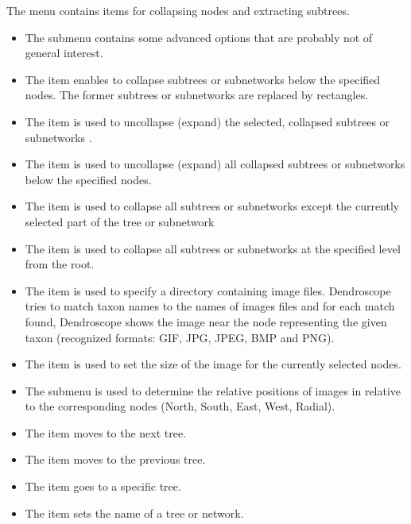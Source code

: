 \documentclass[11pt]{article}
\newcommand{\cs}[1]{\textcolor{red}{#1}}
\begin{document}
The  menu contains items for collapsing nodes and extracting subtrees.
\begin{itemize}
\item The  submenu contains some advanced options that are probably not
of general interest.
\item The  item enables to collapse subtrees or subnetworks below the  specified nodes. The former subtrees or subnetworks  are replaced by rectangles.
\item The  item is used to uncollapse (expand) the selected, collapsed subtrees or  subnetworks .
\item The  item is used to uncollapse (expand) all collapsed subtrees or subnetworks below  the  specified nodes.
\item The  item is used to collapse all subtrees or  subnetworks except the currently selected part of the tree or  subnetwork%
\item The  item is used to collapse all subtrees or  subnetworks at the specified level from the root. 
\item The  item is used to specify a directory containing
image files. Dendroscope tries to match taxon names to the names of images files and for each match
found, Dendroscope shows the image near the node representing the given taxon (recognized formats: GIF, JPG, JPEG, BMP and PNG). %
\item The  item is used to set the size of the image for the currently selected
nodes.
\item The  submenu is used to determine the relative positions of images
in relative to the corresponding nodes (North, South, East, West, Radial).%
\item The  item moves to the next tree.
\item The  item moves to the previous tree.
\item The  item goes to a specific tree.
\item The  item sets the name of a tree or network.
\end{itemize}
\end{document}
